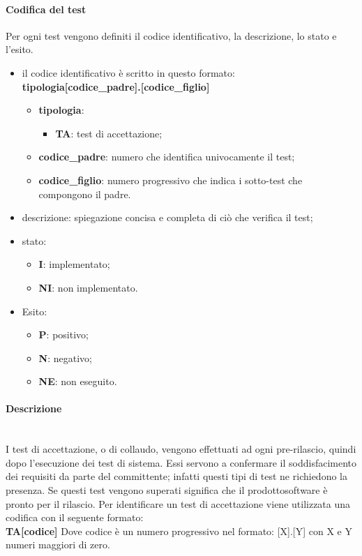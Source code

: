 		\paragraph*{Codifica del test}
		Per ogni test vengono definiti il codice identificativo, la descrizione, lo stato e l'esito.
		\begin{itemize}
			\item il codice identificativo è scritto in questo formato:\\
			\textbf{tipologia[codice\_padre].[codice\_figlio]}
			\begin{itemize}
				\item \textbf{tipologia}:
				\begin{itemize}
					\item \textbf{TA}: test di accettazione;
				\end{itemize}
				\item \textbf{codice\_padre}: numero che identifica univocamente il test;
				\item \textbf{codice\_figlio}: numero progressivo che indica i sotto-test che compongono il padre. 
			\end{itemize}
			\item descrizione: spiegazione concisa e completa di ciò che verifica il test;
			\item stato:
			\begin{itemize}
				\item \textbf{I}: implementato;
				\item \textbf{NI}: non implementato.
			\end{itemize}
			\item Esito:
			\begin{itemize}
				\item \textbf{P}: positivo;
				\item \textbf{N}: negativo;
				\item \textbf{NE}: non eseguito.
			\end{itemize}
		\end{itemize}
		\paragraph*{Descrizione} \mbox{}\\ [1mm]
		I test di accettazione, o di collaudo, vengono effettuati ad ogni pre-rilascio, quindi dopo l'esecuzione dei test di sistema. Essi servono a confermare il soddisfacimento dei requisiti da parte del committente; infatti questi tipi di test ne richiedono la presenza. Se questi test vengono superati significa che il prodotto\glosp software è pronto per il rilascio. 
		Per identificare un test di accettazione viene utilizzata una codifica con il seguente formato:\\
		\textbf{TA[codice]}
		Dove codice è un numero progressivo nel formato: [X].[Y] con X e Y numeri maggiori di zero.
